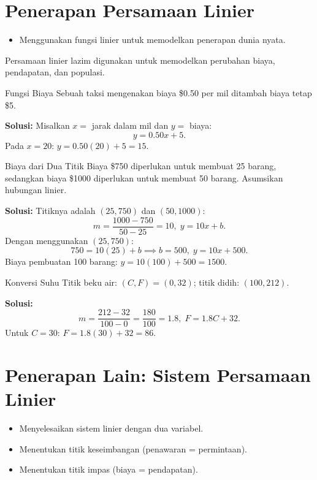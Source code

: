 \section{Penerapan Persamaan Linier}
\begin{outcome}
\begin{itemize}
\item Menggunakan fungsi linier untuk memodelkan penerapan dunia nyata.
\end{itemize}
\end{outcome}

Persamaan linier lazim digunakan untuk memodelkan perubahan biaya, pendapatan, dan populasi.

\begin{example}{Fungsi Biaya}\label{exa:cost-function}
Sebuah taksi mengenakan biaya \$0.50 per mil ditambah biaya tetap \$5.

\textbf{Solusi:} Misalkan $x=$ jarak dalam mil dan $y=$ biaya:
\[
y=0.50x+5.
\]
Pada $x=20$: $y=0.50(20)+5=15.$
\end{example}

\begin{example}{Biaya dari Dua Titik}\label{exa:cost-two-points}
Biaya \$750 diperlukan untuk membuat 25 barang, sedangkan biaya \$1000 diperlukan untuk membuat 50 barang. Asumsikan hubungan linier.

\textbf{Solusi:} Titiknya adalah $(25,750)$ dan $(50,1000)$:
\[
m=\frac{1000-750}{50-25}=10,\;y=10x+b.
\]
Dengan menggunakan $(25,750)$:
\[
750=10(25)+b \implies b=500,\;y=10x+500.
\]
Biaya pembuatan 100 barang: $y=10(100)+500=1500.$
\end{example}

\begin{example}{Konversi Suhu}\label{exa:temp-conversion}
Titik beku air: $(C,F)=(0,32)$; titik didih: $(100,212)$.

\textbf{Solusi:}
\[
m=\frac{212-32}{100-0}=\frac{180}{100}=1.8,\;F=1.8C+32.
\]
Untuk $C=30$: $F=1.8(30)+32=86.$
\end{example}

\section{Penerapan Lain: Sistem Persamaan Linier}
\begin{outcome}
\begin{itemize}
\item Menyelesaikan sistem linier dengan dua variabel.
\item Menentukan titik keseimbangan (penawaran = permintaan).
\item Menentukan titik impas (biaya = pendapatan).
\end{itemize}
\end{outcome}


